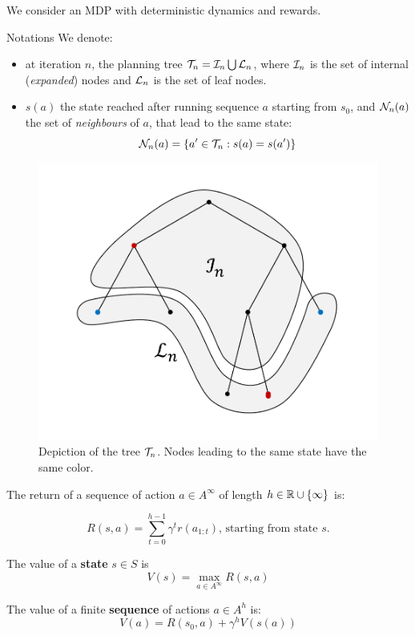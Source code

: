 \documentclass[runningheads]{llncs}
\begin{document}
We consider an MDP with deterministic dynamics and rewards.

\begin{paragraph}{Notations}
We denote:
\begin{itemize}
\item at iteration $n$, the planning tree $\mathcal{T}_n = \mathcal{I}_n \bigcup \mathcal{L}_n$, where $\mathcal{I}_n$ is the set of internal (\emph{expanded}) nodes and $\mathcal{L}_n$ is the set of leaf nodes.
\item $s(a)$ the state reached after running sequence $a$ starting from $s_0$, and $\mathcal{N}_n(a)$ the set of \emph{neighbours} of $a$, that lead to the same state:  \[\mathcal{N}_n(a) = \{a'\in\mathcal{T}_n: s(a)=s(a')\}\]
\end{itemize}
\end{paragraph}

\begin{figure}[H]
	\centering
	\includegraphics[trim={1.8cm 1.2cm 1.9cm 1.2cm}, clip,width=0.4\linewidth]{img/tree_1}
	\caption{Depiction of the tree $\mathcal{T}_n$. Nodes leading to the same state have the same color.}
\end{figure}

\begin{definition}[Values]
The return of a sequence of action $a\in A^\infty$ of length $h\in\mathbb{R}\cup\{\infty\}$ is:

\[R(s,a) = \sum_{t=0}^{h-1} \gamma^t r(a_{1:t}) ,\, \text{starting from state $s$.}\]

The value of a \textbf{state} $s\in S$ is
\begin{equation}
    V(s) = \max_{a\in A^\infty} R(s, a)
\end{equation}

The value of a finite \textbf{sequence} of actions $a\in A^h$ is:
\begin{equation}
\label{eq:state_value}
    V(a) = R(s_0,a) + \gamma^{h} V(s(a))
\end{equation}
\end{definition}
\end{document}
